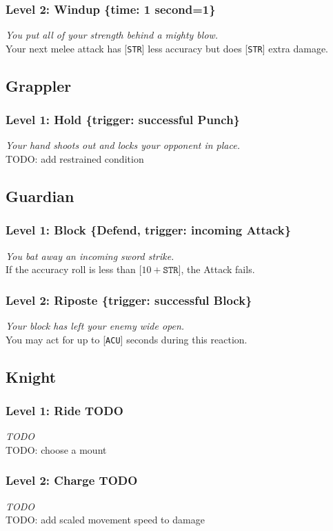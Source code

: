 \documentclass[12pt]{article}
\newcommand{\STR}{\texttt{STR}}
\newcommand{\ACU}{\texttt{ACU}}
\newcommand{\TIME}[1]{\{time: #1 second\if1=#1{}\else{s}\fi\}}
\newcommand{\TRIG}[1]{\{trigger: #1\}}
\newcommand{\Defend}{\{Defend, trigger: incoming Attack\}}
\newcommand{\Class}[1]{\pagebreak\subsection{#1}\label{#1}}
\newcommand{\Skill}[5]{\subsubsection{Level #1: #2 #3}\textit{#4}\\[1mm]#5}
\begin{document}
\Skill{2}{Windup}{\TIME{1}}
{You put all of your strength behind a mighty blow.}
{Your next melee attack has [\STR] less accuracy but does [\STR] extra damage.}

\Class{Grappler}

\Skill{1}{Hold}{\TRIG{successful Punch}}
{Your hand shoots out and locks your opponent in place.}
{TODO: add restrained condition}

\Class{Guardian}

\Skill{1}{Block}{\Defend}
{You bat away an incoming sword strike.}
{If the accuracy roll is less than [$10 + \STR$], the Attack fails.}

\Skill{2}{Riposte}{\TRIG{successful Block}}
{Your block has left your enemy wide open.}
{You may act for up to [\ACU] seconds during this reaction.}

\Class{Knight}

\Skill{1}{Ride}{TODO}
{TODO}
{TODO: choose a mount}

\Skill{2}{Charge}{TODO}
{TODO}
{TODO: add scaled movement speed to damage}
\end{document}
